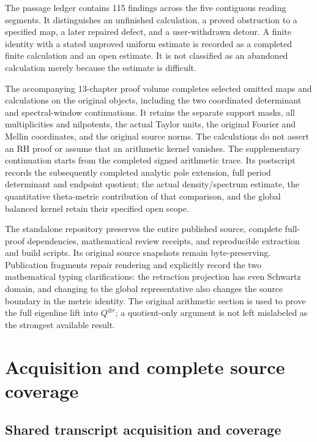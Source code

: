 \documentclass[10pt,a4paper,oneside]{report}
\begin{document}
The passage ledger contains 115 findings across the five contiguous
reading segments. It distinguishes an unfinished calculation, a proved
obstruction to a specified map, a later repaired defect, and a
user-withdrawn detour. A finite identity with a stated unproved uniform
estimate is recorded as a completed finite calculation and an open
estimate. It is not classified as an abandoned calculation merely
because the estimate is difficult.

The accompanying 13-chapter proof volume completes selected omitted maps
and calculations on the original objects, including the two coordinated
determinant and spectral-window continuations. It retains the separate
support masks, all multiplicities and nilpotents, the actual Taylor
units, the original Fourier and Mellin coordinates, and the original
source norms. The calculations do not assert an RH proof or assume that
an arithmetic kernel vanishes. The supplementary continuation starts
from the completed signed arithmetic trace. Its postscript records the
subsequently completed analytic pole extension, full period determinant
and endpoint quotient; the actual density/spectrum estimate, the
quantitative theta-metric contribution of that comparison, and the
global balanced kernel retain their specified open scope.

The standalone repository preserves the entire published source,
complete full-proof dependencies, mathematical review receipts, and
reproducible extraction and build scripts. Its original source snapshots
remain byte-preserving. Publication fragments repair rendering and
explicitly record the two mathematical typing clarifications: the
retraction projection has even Schwartz domain, and changing to the
global representative also changes the source boundary in the metric
identity. The original arithmetic section is used to prove the full
eigenline lift into \(Q^{\otimes r}\); a quotient-only argument is not
left mislabeled as the strongest available result.

\clearpage

\chapter{Acquisition and complete source
coverage}\label{acquisition-and-complete-source-coverage}

\section{Shared transcript acquisition and
coverage}\label{shared-transcript-acquisition-and-coverage}
\end{document}
